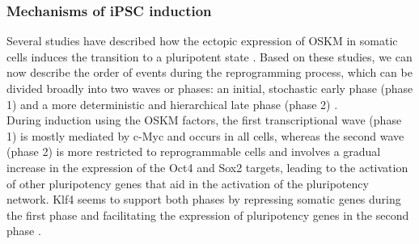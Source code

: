 


\subsubsection{Mechanisms of iPSC induction}


Several studies have described how the ectopic expression of OSKM in somatic cells induces the transition to a pluripotent state \cite{yamanaka2007strategies, brambrink2008sequential, stadtfeld2008induced, polo2012molecular, hansson2012highly, buganim2012single}. 
Based on these studies, we can now describe the order of events during the reprogramming process, which can be divided broadly into two waves or phases: an initial, stochastic early phase (phase 1) and a more deterministic and hierarchical late phase (phase 2) \cite{omole2018ten, takahashi2016decade, brouwer2016choices}.\\

During induction using the OSKM factors, the first transcriptional wave (phase 1) is mostly mediated by c-Myc and occurs in all cells, whereas the second wave (phase 2) is more restricted to reprogrammable cells and involves a gradual increase in the expression of the Oct4 and Sox2 targets, leading to the activation of other pluripotency genes that aid in the activation of the pluripotency network. 
Klf4 seems to support both phases by repressing somatic genes during the first phase and facilitating the expression of pluripotency genes in the second phase \cite{buganim2013mechanisms}.\\

